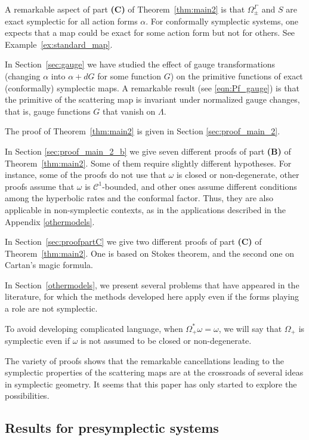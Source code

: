 \documentclass[11pt]{amsart}
\theoremstyle{definition}
\theoremstyle{remark}
\numberwithin{equation}{section}
\newcommand{\C}{\mathcal{C}}
\begin{document}
A remarkable aspect of part {\bf(C)} of
Theorem~\ref{thm:main2} is that $\Omega_\pm^\Gamma$   and $S$ are  exact symplectic
for all action forms $\alpha$.
For conformally symplectic systems, one expects that a map could be exact for some action
form but not for others. See Example~\ref{ex:standard_map}.

In Section~\ref{sec:gauge} we have studied the effect of gauge transformations
(changing $\alpha$ into $\alpha + dG$ for some function $G$) on the primitive
functions of exact (conformally) symplectic maps.
A remarkable result (see \eqref{eqn:Pf_gauge}) is that  the primitive of the scattering map
is invariant under normalized gauge changes, that is, gauge functions $G$ that vanish on $\Lambda$.



The proof of Theorem~\ref{thm:main2} is given in Section \ref{sec:proof_main_2}.

In Section \ref{sec:proof_main_2_b} we give seven different proofs of part \textbf{(B)}
of Theorem~\ref{thm:main2}. Some of them require slightly different hypotheses.
For instance, some of the proofs do not use that $\omega$ is closed or non-degenerate, other proofs
assume that $\omega$ is $\C^1$-bounded, and other ones assume
different conditions among  the hyperbolic rates and the conformal factor.
Thus, they  are also applicable in non-symplectic contexts, as in the applications described in the Appendix
\ref{othermodels}.

In Section~\ref{sec:proofpartC} we give two different proofs of part \textbf{(C)} of
Theorem~\ref{thm:main2}.
One  is based on Stokes theorem, and the second one on Cartan's magic formula.

In Section~\ref{othermodels}, we present several problems
that have
appeared in the literature, for which the methods developed
here apply even if the forms playing a role  are not symplectic.

\medskip
To avoid developing complicated language,  when
$\Omega_+^* \omega = \omega$, we will say that $\Omega_+$ is
symplectic even if $\omega$ is not assumed to be closed or non-degenerate.
\medskip

The variety of  proofs shows that the remarkable cancellations leading to
the symplectic properties of the scattering maps are at the crossroads of
several ideas in symplectic geometry. It seems that this paper
has  only started to explore the possibilities.

\subsection{Results for presymplectic systems}
\label{sec:presymplectic}
\end{document}
